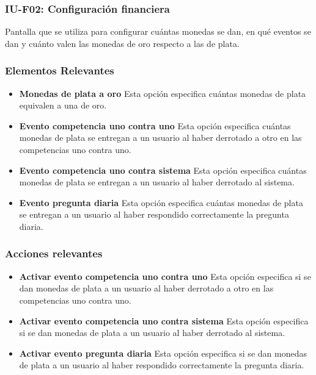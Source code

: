 
\subsubsection{IU-F02: Configuración financiera}

 Pantalla que se utiliza para configurar cuántas monedas se dan, en qué eventos se dan y cuánto valen las monedas de oro respecto a las de plata.

\subsubsection{Elementos Relevantes}

    \begin{itemize}
        \item {\bf Monedas de plata a oro}
            Esta opción especifica cuántas monedas de plata equivalen a una de oro.
        \item {\bf Evento competencia uno contra uno}
            Esta opción especifica cuántas monedas de plata se entregan a un usuario al haber derrotado a otro en las competencias uno contra uno.
        \item {\bf Evento competencia uno contra sistema}
            Esta opción especifica cuántas monedas de plata se entregan a un usuario al haber derrotado al sistema.
        \item {\bf Evento pregunta diaria}
            Esta opción especifica cuántas monedas de plata se entregan a un usuario al haber respondido correctamente la pregunta diaria.
    \end{itemize}

\subsubsection{Acciones relevantes}

    \begin{itemize}
        \item {\bf Activar evento competencia uno contra uno}
            Esta opción especifica si se dan monedas de plata a un usuario al haber derrotado a otro en las competencias uno contra uno.
        \item {\bf Activar evento competencia uno contra sistema}
            Esta opción especifica si se dan monedas de plata a un usuario al haber derrotado al sistema.
        \item {\bf Activar evento pregunta diaria}
            Esta opción especifica si se dan monedas de plata a un usuario al haber respondido correctamente la pregunta diaria.
    \end{itemize}

\clearpage
